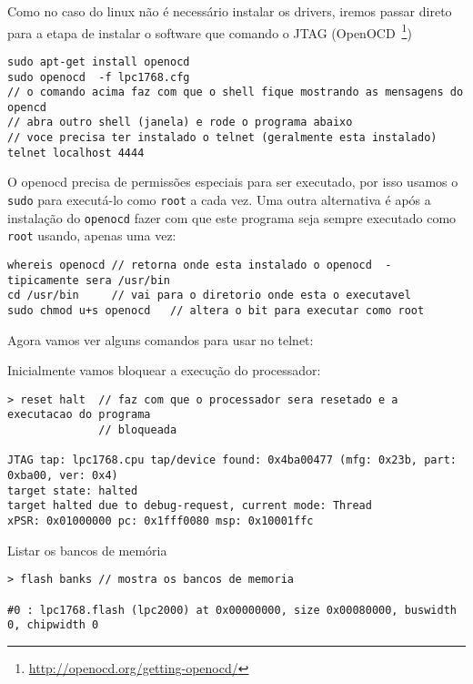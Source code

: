 \documentclass[a4paper,10pt]{article}
\begin{document}
Como no caso do linux não é necessário instalar os drivers, iremos passar direto para a etapa de instalar o software que comando o JTAG (OpenOCD~\footnote{\url{http://openocd.org/getting-openocd/}})

\begin{lstlisting}
sudo apt-get install openocd
sudo openocd  -f lpc1768.cfg 
// o comando acima faz com que o shell fique mostrando as mensagens do opencd
// abra outro shell (janela) e rode o programa abaixo
// voce precisa ter instalado o telnet (geralmente esta instalado)
telnet localhost 4444

\end{lstlisting}
O openocd precisa de permissões especiais para ser executado, por isso usamos o \verb|sudo| para executá-lo como \verb|root| a cada vez. Uma outra alternativa é após a instalação do \verb|openocd| fazer com que este programa seja sempre executado como \verb|root| usando, apenas uma vez:
\begin{lstlisting}
whereis openocd // retorna onde esta instalado o openocd  - tipicamente sera /usr/bin
cd /usr/bin     // vai para o diretorio onde esta o executavel
sudo chmod u+s openocd   // altera o bit para executar como root
\end{lstlisting}

Agora vamos ver alguns comandos para usar no telnet:

Inicialmente vamos bloquear a execução do processador:
\begin{lstlisting}
> reset halt  // faz com que o processador sera resetado e a executacao do programa
              // bloqueada
              
JTAG tap: lpc1768.cpu tap/device found: 0x4ba00477 (mfg: 0x23b, part: 0xba00, ver: 0x4)
target state: halted
target halted due to debug-request, current mode: Thread 
xPSR: 0x01000000 pc: 0x1fff0080 msp: 0x10001ffc
\end{lstlisting}

Listar os bancos de memória
\begin{lstlisting}
> flash banks // mostra os bancos de memoria

#0 : lpc1768.flash (lpc2000) at 0x00000000, size 0x00080000, buswidth 0, chipwidth 0
\end{lstlisting}
\end{document}
